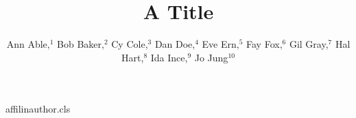 \begin{filecontents*}[overwrite]{affilinauthor.cls}
\RequirePackage{xcolor}
\def\YES{yes}
\def\chk@key{no}
\def\affilfont{\small\leftskip2em\rightskip0pt plus1fil}
\def\affil#1{\par\ifx\chk@key\YES\else\vskip6\p@\fi{\reset@font\affilfont#1\par}\def\chk@key{yes}}
\def\@maketitle{\newpage{\Large\bfseries\@title\par}\vskip1em\noindent{\bfseries\@author\par}\vskip1em}
\end{filecontents*}
\documentclass{affilinauthor}

\title{A Title}
\author{Ann Able,$^1$ Bob Baker,$^2$ Cy Cole,$^3$ Dan Doe,$^4$ Eve Ern,$^5$ Fay Fox,$^6$ Gil Gray,$^7$ Hal Hart,$^8$
Ida Ince,$^9$ Jo Jung$^{10}$
}
\maketitle
Body.

